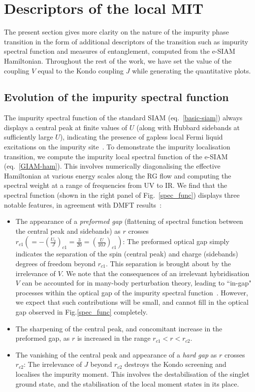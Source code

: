 \documentclass{iopart}
\begin{document}
\section{Descriptors of the local MIT}
\label{desc-mit}

The present section gives more clarity on the nature of the impurity phase transition in the form of additional descriptors of the transition such as impurity spectral function and measures of entanglement, computed from the e-SIAM Hamiltonian. Throughout the rest of the work, we have set the value of the coupling \(V\) equal to the Kondo coupling \(J\) while generating the quantitative plots.

\subsection{Evolution of the impurity spectral function}

The impurity spectral function of the standard SIAM (eq.~\eqref{basic-siam}) always displays a central peak at finite values of \(U\) (along with Hubbard sidebands at sufficiently large \(U\)), indicating the presence of gapless local Fermi liquid excitations on the impurity site~\cite{wilson1975,nozieres1974fermi,costi_hewson_1990}. To demonstrate the impurity localisation transition, we compute the impurity local spectral function of the e-SIAM (eq.~\eqref{GIAM-ham}). This involves numerically diagonalising the effective Hamiltonian at various energy scales along the RG flow and computing the spectral weight at a range of frequencies from UV to IR. We find that the spectral function (shown in the right panel of Fig.~\eqref{spec_func}) displays three notable features, in agreement with DMFT results~\cite{georges1996}:
\begin{itemize}
	\item The appearance of a {\it preformed gap} (flattening of spectral function between the central peak and sidebands) as \(r\) crosses \(r_{c1} \left(= -\left(\frac{U_b}{J}\right)_{c1} = \frac{3}{20} = \left(\frac{U}{10 J}\right)_{c1}\right)\): The preformed optical gap simply indicates the separation of the spin (central peak) and charge (sidebands) degrees of freedom beyond \(r_{c1}\). This separation is brought about by the irrelevance of \(V\). We note that the consequences of an irrelevant hybridisation \(V\) can be accounted for in many-body perturbation theory, leading to ``in-gap" processes within the optical gap of the impurity spectral function~\cite{nozieres_dmft}. However, we expect that such contributions will be small, and cannot fill in the optical gap observed in Fig.\ref{spec_func} completely.
	\item The sharpening of the central peak, and concomitant increase in the preformed gap, as $r$ is increased in the range $r_{c1} < r < r_{c2}$.
	\item The vanishing of the central peak and appearance of a {\it hard gap} as \(r\) crosses \(r_{c2}\): The irrelevance of \(J\) beyond \(r_{c2}\) destroys the Kondo screening and localises the impurity moment. This involves the destabilisation of the singlet ground state, and the stabilisation of the local moment states in its place.
\end{itemize}
\end{document}

